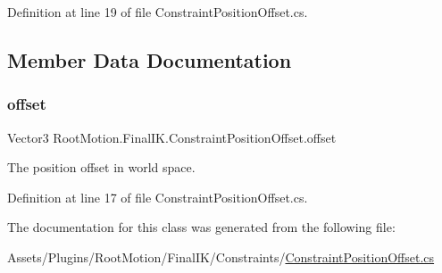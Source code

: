 Definition at line 19 of file Constraint\+Position\+Offset.\+cs.



\subsection{Member Data Documentation}
\mbox{\label{class_root_motion_1_1_final_i_k_1_1_constraint_position_offset_a4ab0d6039063eb10ef96065ff2308fe5}} 
\subsubsection{\texorpdfstring{offset}{offset}}
{\footnotesize\ttfamily Vector3 Root\+Motion.\+Final\+I\+K.\+Constraint\+Position\+Offset.\+offset}



The position offset in world space. 



Definition at line 17 of file Constraint\+Position\+Offset.\+cs.



The documentation for this class was generated from the following file\+:\begin{DoxyCompactItemize}
\item 
Assets/\+Plugins/\+Root\+Motion/\+Final\+I\+K/\+Constraints/\mbox{\hyperlink{_constraint_position_offset_8cs}{Constraint\+Position\+Offset.\+cs}}\end{DoxyCompactItemize}
